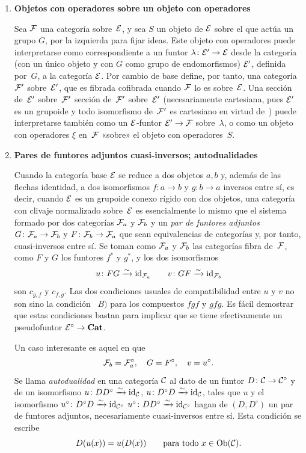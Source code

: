 \begin{enumerate}
\medskip
\item[c)] \textbf{Objetos con operadores sobre un objeto con operadores}

Sea $\cal{F}$ una categoría sobre~$\cal{E}$, y sea $S$ un objeto de
$\cal{E}$ sobre el que actúa un grupo $G$, por la izquierda para fijar
ideas. Este objeto con operadores puede interpretarse como correspondiente
a un funtor $\lambda\colon\cal{E}'\to\cal{E}$ desde la categoría (con un
único objeto y con $G$ como grupo de endomorfismos) $\cal{E}'$, definida
por~$G$, a la categoría $\cal{E}$. Por cambio de base define,
por tanto, una categoría $\cal{F}'$ sobre~$\cal{E}'$, que es fibrada
\resp cofibrada cuando $\cal{F}$ lo es sobre~$\cal{E}$. Una
{sección de~$\cal{E}'$ sobre~$\cal{F}'$}
{sección de~$\cal{F}'$ sobre~$\cal{E}'$}
(necesariamente cartesiana, pues $\cal{E}'$ es un grupoide y todo
isomorfismo de~$\cal{F}'$ es cartesiano en virtud de~) puede
interpretarse también como un $\cal{E}$-funtor
$\cal{E}'\to\cal{F}$ sobre~$\lambda$, o como un objeto con operadores
$\xi$ en~$\cal{F}$ «sobre» el objeto con operadores~$S$.

\medskip
\item[d)] \textbf{Pares de funtores adjuntos cuasi-inversos;
autodualidades}

Cuando la categoría base $\cal{E}$ se reduce a dos objetos $a,b$ y, además
de las flechas identidad, a dos isomorfismos $f\colon a\to b$ y
$g\colon b\to a$ inversos entre sí, es decir, cuando $\cal{E}$ es un
grupoide conexo rígido con dos objetos, una categoría con clivaje
normalizado sobre~$\cal{E}$ es esencialmente lo mismo que el sistema
formado por dos categorías $\cal{F}_a$ y $\cal{F}_b$ y un \emph{par de
funtores adjuntos} $G\colon\cal{F}_a\to\cal{F}_b$ y
$F\colon\cal{F}_b\to\cal{F}_a$ que sean equivalencias de categorías y,
por tanto, cuasi-inversos entre sí. Se toman como $\cal{F}_a$ y
$\cal{F}_b$ las categorías fibra de~$\cal{F}$, como $F$ y $G$ los funtores
$f^*$ y $g^*$, y los dos isomorfismos
$$
u\colon FG\isomto\id_{\cal{F}_a}\qquad v\colon
GF\isomto\id_{\cal{F}_b}
$$
son $c_{g,f}$ y $c_{f,g}$. Las dos condiciones usuales de compatibilidad
entre $u$ y $v$ no son sino la condición ~$B)$ para los
compuestos $fgf$ y $gfg$. Es fácil demostrar que estas condiciones bastan
para implicar que se tiene efectivamente un pseudofuntor
$\cal{E}^\circ\to\Cat$.

Un caso interesante es aquel en que
$$
\cal{F}_b=\cal{F}_a^\circ,\quad G=F^\circ,\quad v=u^\circ.
$$
Se llama \emph{autodualidad}
%
en una categoría $\cal{C}$ al dato de un funtor
$D\colon\cal{C}\to\cal{C}^\circ$ y de un isomorfismo
{$u\colon DD^\circ\isomto\id_{\cal{C}}$,}
{$u\colon D^\circ D\isomto\id_{\cal{C}}$,}
tales que $u$ y el isomorfismo
{$u^\circ\colon D^\circ D\isomto\id_{\cal{C}^\circ}$}
{$u^\circ\colon DD^\circ\isomto\id_{\cal{C}^\circ}$}
hagan de $(D,D^\circ)$ un par de funtores adjuntos, necesariamente
cuasi-inversos entre sí. Esta condición se escribe
$$
D(u(x))=u(D(x))\qquad \text{para todo $x\in\Ob(\cal{C})$.}
$$


\end{enumerate}
